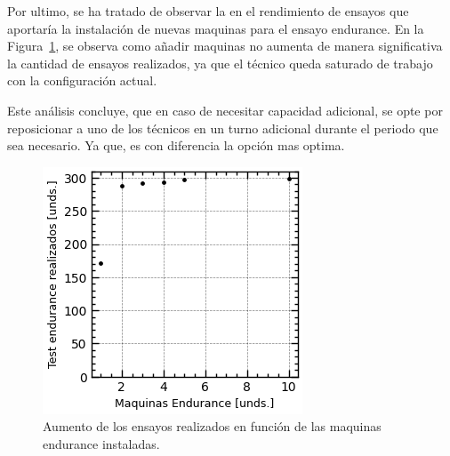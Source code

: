 Por ultimo, se ha tratado de observar la en el rendimiento de ensayos
que aportaría la instalación de nuevas maquinas para el ensayo endurance.
En la Figura~\ref{fig:4_sctr_indoor}, se observa como añadir maquinas
no aumenta de manera significativa la cantidad de ensayos realizados,
ya que el técnico queda saturado de trabajo con la configuración actual.

Este análisis concluye, que en caso de necesitar capacidad adicional,
se opte por reposicionar a uno de los técnicos
en un turno adicional durante el periodo que sea necesario.
Ya que, es con diferencia la opción mas optima.

\begin{figure}
	\begin{center}
	\includegraphics{fig/4_sctr_indoor}
	\end{center}
	\caption{Aumento de los ensayos realizados en función de las maquinas endurance instaladas.}
	\label{fig:4_sctr_indoor}
\end{figure}
